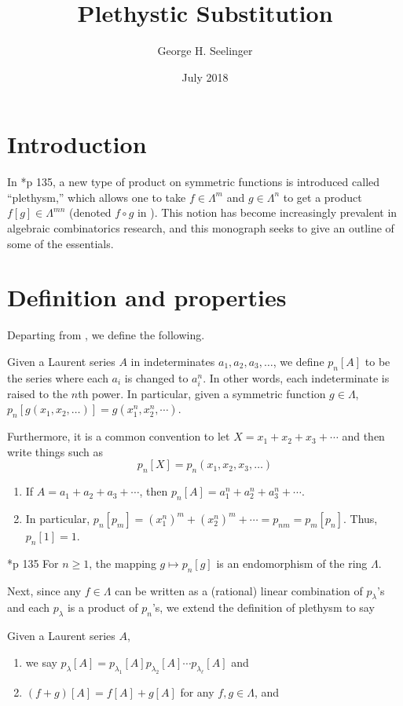 \documentclass[11pt,leqno,oneside]{amsart}
\title[Plethystic Substitution]{Plethystic Substitution}
\author{George H. Seelinger}
\date{July 2018}
\numberwithin{thm}{section}
\newcommand{\sym}{\Lambda}
\begin{document}
\maketitle
\section{Introduction}
In \cite{macdonald}*{p 135}, a new type of product on symmetric
functions is introduced called ``plethysm,'' which allows one to take
\(f \in \sym^m\) and \(g \in \sym^n\) to get a product \(f[g] \in
\sym^{mn}\) (denoted \(f \circ g\) in \cite{macdonald}). This notion
has become increasingly prevalent in algebraic combinatorics research,
and this monograph seeks to give an outline of some of the essentials.
\section{Definition and properties}
Departing from \cite{macdonald}, we define the following.
\begin{defn}
  Given a Laurent series \(A\) in indeterminates \(a_1, a_2, a_3,
  \ldots\), we define \(p_n[A]\) to be the series where each \(a_i\)
  is changed to \(a_i^n\). In other words, each indeterminate is
  raised to the \(n\)th power. In particular, given a symmetric function
  \(g \in \sym\), \(p_n[g(x_1,x_2,\ldots)] = g(x_1^n, x_2^n, \cdots)\).
\end{defn}
Furthermore, it is a common convention to let \(X =
x_1+x_2+x_3+\cdots\) and then write things such as \[
  p_n[X] = p_n(x_1, x_2, x_3, \ldots)
\]
\begin{example}\label{first-examples}
  \begin{enumerate}
  \item If \(A = a_1+a_2+a_3+\cdots\), then \(p_n[A] =
    a_1^n+a_2^n+a_3^n+\cdots\).
  \item In particular, \(p_n[p_m] = (x_1^n)^m+(x_2^n)^m+\cdots =
    p_{nm} = p_m[p_n]\). Thus, \(p_n[1] = 1\).
  \end{enumerate}
\end{example}
\begin{prop}
  \cite{macdonald}*{p 135} For \(n \geq 1\), the mapping \(g \mapsto
  p_n[g]\) is an endomorphism of the ring \(\sym\).
\end{prop}
Next, since any \(f \in \sym\) can be written as a (rational) linear
combination of \(p_\lambda\)'s and each \(p_\lambda\) is a product of
\(p_n\)'s, we extend the definition of plethysm to say
\begin{defn}
  Given a Laurent series \(A\),
  \begin{enumerate}
  \item we say \(p_\lambda[A] = p_{\lambda_1}[A] p_{\lambda_2}[A]
    \cdots p_{\lambda_\ell}[A]\) and 
  \item\((f+g)[A] = f[A]+g[A]\) for any \(f,g \in \sym\), and
  \end{enumerate}
\end{defn}
\end{document}
